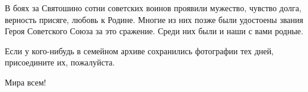 В боях за Святошино сотни советских воинов проявили мужество, чувство долга,
верность присяге, любовь к Родине. Многие из них позже были удостоены звания
Героя Советского Союза за это сражение. Среди них были и наши с вами родные. 

Если у кого-нибудь в семейном архиве сохранились фотографии тех дней,
присоедините их, пожалуйста.

Мира всем!

